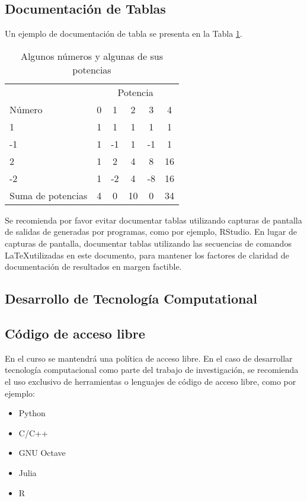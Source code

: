 \documentclass[peerreview]{IEEEtran}
\begin{document}
\subsection{Documentaci\'on de Tablas}

Un ejemplo de documentaci\'on de tabla se presenta en la Tabla \ref{tab:cuadro-ejemplo}.

\begin{table}
\centering
\begin{tabular}{l c c c c c}
\toprule
& \multicolumn{5}{c}{Potencia} \\
\cmidrule(l){2-6}
N\'umero & 0 & 1 & 2 & 3 & 4\\
\midrule
1 & 1 & 1 & 1 & 1 & 1\\
-1 & 1 & -1 & 1 & -1 & 1\\
2 & 1 & 2 & 4 & 8 & 16\\
-2 & 1 & -2 & 4 & -8 & 16\\
\midrule
\midrule
Suma de potencias & 4 & 0 & 10 & 0 & 34\\
\bottomrule
\end{tabular}
\smallskip 
\caption{Algunos n\'umeros y algunas de sus potencias}
\label{tab:cuadro-ejemplo}
\end{table}

Se recomienda por favor evitar documentar tablas utilizando capturas de pantalla de salidas de generadas por programas, como por ejemplo, RStudio. En lugar de capturas de pantalla, documentar tablas utilizando las secuencias de comandos \LaTeX utilizadas en este documento, para mantener los factores de claridad de documentaci\'on de resultados en margen factible.

\subsection{Desarrollo de Tecnolog\'ia Computational}

\subsection{C\'odigo de acceso libre}

En el curso se mantendr\'a una pol\'itica de acceso libre. En el caso de desarrollar tecnolog\'ia computacional como parte del trabajo de investigaci\'on, se recomienda el uso exclusivo de herramientas o lenguajes de c\'odigo de acceso libre, como por ejemplo:
\begin{itemize}
\item Python
\item C/C++
\item GNU Octave
\item Julia
\item R
\end{itemize}
\end{document}
